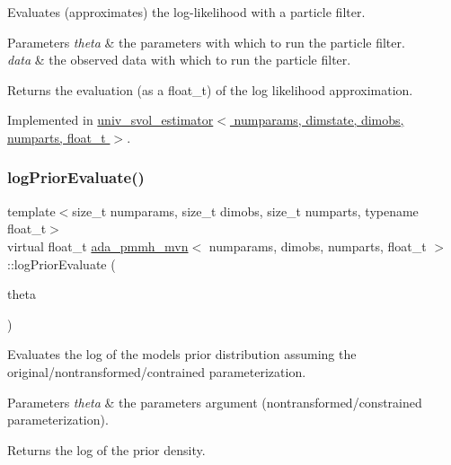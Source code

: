 Evaluates (approximates) the log-\/likelihood with a particle filter. 


\begin{DoxyParams}{Parameters}
{\em theta} & the parameters with which to run the particle filter. \\
\hline
{\em data} & the observed data with which to run the particle filter. \\
\hline
\end{DoxyParams}
\begin{DoxyReturn}{Returns}
the evaluation (as a float\+\_\+t) of the log likelihood approximation. 
\end{DoxyReturn}


Implemented in \hyperlink{classuniv__svol__estimator_a1223321e7875a4d40f9c4817753a2e01}{univ\+\_\+svol\+\_\+estimator$<$ numparams, dimstate, dimobs, numparts, float\+\_\+t $>$}.

\mbox{\label{classada__pmmh__mvn_af946eae70a63045515ed7830c35106dc}} 
\subsubsection{\texorpdfstring{log\+Prior\+Evaluate()}{logPriorEvaluate()}}
{\footnotesize\ttfamily template$<$size\+\_\+t numparams, size\+\_\+t dimobs, size\+\_\+t numparts, typename float\+\_\+t$>$ \\
virtual float\+\_\+t \hyperlink{classada__pmmh__mvn}{ada\+\_\+pmmh\+\_\+mvn}$<$ numparams, dimobs, numparts, float\+\_\+t $>$\+::log\+Prior\+Evaluate (\begin{DoxyParamCaption}\item[{const \hyperlink{classparamPack}{param\+Pack}$<$ float\+\_\+t $>$ \&}]{theta }\end{DoxyParamCaption})\hspace{0.3cm}{\ttfamily [pure virtual]}}



Evaluates the log of the model\textquotesingle{}s prior distribution assuming the original/nontransformed/contrained parameterization. 


\begin{DoxyParams}{Parameters}
{\em theta} & the parameters argument (nontransformed/constrained parameterization). \\
\hline
\end{DoxyParams}
\begin{DoxyReturn}{Returns}
the log of the prior density. 
\end{DoxyReturn}


